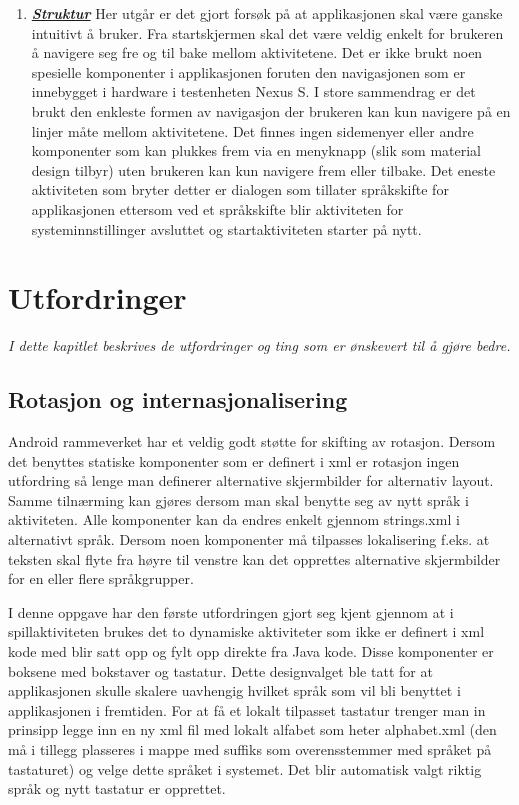 \begin{enumerate}
\item \textbf{\textsl{\href{https://www.google.com/design/spec/patterns/app-structure.html}{Struktur}}}
Her utgår er det gjort forsøk på at applikasjonen skal være ganske intuitivt å bruker. Fra startskjermen skal det være veldig enkelt for brukeren å navigere seg fre og til bake mellom aktivitetene. Det er ikke brukt noen spesielle komponenter i applikasjonen foruten den navigasjonen som er innebygget i hardware i testenheten Nexus S. I store sammendrag er det brukt den enkleste formen av navigasjon der brukeren kan kun navigere på en linjer måte mellom aktivitetene. Det finnes ingen sidemenyer eller andre komponenter som kan plukkes frem via en menyknapp (slik som material design tilbyr) uten brukeren kan kun navigere frem eller tilbake. Det eneste aktiviteten som bryter detter er dialogen som tillater språkskifte for applikasjonen ettersom ved et språkskifte blir aktiviteten for systeminnstillinger avsluttet og startaktiviteten starter på nytt. 

\end{enumerate} 







\chapter{Utfordringer}
\emph{I dette kapitlet beskrives de utfordringer og ting som er ønskevert til å gjøre bedre.}

\section{Rotasjon og internasjonalisering}
Android rammeverket har et veldig godt støtte for skifting av rotasjon. Dersom det benyttes statiske komponenter som er definert i xml er rotasjon ingen utfordring så lenge man definerer alternative skjermbilder for alternativ layout. Samme tilnærming kan gjøres dersom man skal benytte seg av nytt språk i aktiviteten. Alle komponenter kan da endres enkelt gjennom strings.xml i alternativt språk. Dersom noen komponenter må tilpasses lokalisering f.eks. at teksten skal flyte fra høyre til venstre kan det opprettes alternative skjermbilder for en eller flere språkgrupper. 

I denne oppgave har den første utfordringen gjort seg kjent gjennom at i spillaktiviteten brukes det to dynamiske aktiviteter som ikke er definert i xml kode med blir satt opp og fylt opp direkte fra Java kode. Disse komponenter er boksene med bokstaver og tastatur. Dette designvalget ble tatt for at applikasjonen skulle skalere uavhengig hvilket språk som vil bli benyttet i applikasjonen i fremtiden. For at få et lokalt tilpasset tastatur trenger man in prinsipp legge inn en ny xml fil med lokalt alfabet som heter alphabet.xml (den må i tillegg plasseres i mappe med suffiks som overensstemmer med språket på tastaturet) og velge dette språket i systemet. Det blir automatisk valgt riktig språk og nytt tastatur er opprettet. 


